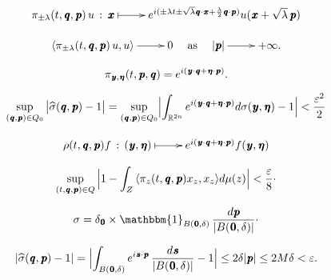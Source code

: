 \documentclass[11pt,english,a4paper]{article}
\begin{document}
\[
\xymatrix{
\pi _{\pm\lambda }(t,{\mkern 1.5 mu\pmb{q}},{\mkern 1.5 mu\pmb{p}})\,u\,:\,{\mkern 1.5 mu\pmb{x}}\ar@{|->}[r]&e^{i(\pm\lambda t\pm\sqrt{\lambda }{\mkern 1.5 mu\pmb{q}}\cdot {\mkern 1.5 mu\pmb{x}}+\frac{\lambda }{2}{\mkern 1.5 mu\pmb{q}}\cdot{\mkern 1.5 mu\pmb{p}})}u({\mkern 1.5 mu\pmb{x}}+\sqrt{\lambda }\,{\mkern 1.5 mu\pmb{p}})
}
\]

\[
\xymatrix{{\ensuremath{{\langle {\pi _{\pm\lambda }(t,{\mkern 1.5 mu\pmb{q}},{\mkern 1.5 mu\pmb{p}})\,u},{u}\rangle}}}\ar[r]&0}\quad\textrm{as}\quad
\xymatrix{|{\mkern 1.5 mu\pmb{p}}|\ar[r]&+\infty .}
\]

\[
\pi _{{\mkern 1.5 mu\pmb{y}},{\mkern 1.5 mu\pmb{\eta}} }(t,{\mkern 1.5 mu\pmb{p}},{\mkern 1.5 mu\pmb{q}})=e^{i({\mkern 1.5 mu\pmb{y}}\cdot{\mkern 1.5 mu\pmb{q}}+{\mkern 1.5 mu\pmb{\eta}}\cdot {\mkern 1.5 mu\pmb{p}})}.
\]

\begin{equation}\label{Equation 20}
 \sup_{({\mkern 1.5 mu\pmb{q}},{\mkern 1.5 mu\pmb{p}})\in{Q}_{0}}\,\bigl|\widehat{\sigma }({\mkern 1.5 mu\pmb{q}},{\mkern 1.5 mu\pmb{p}})-1\bigr|=\sup_{({\mkern 1.5 mu\pmb{q}},{\mkern 1.5 mu\pmb{p}})\in{Q}_{0}}
\Bigl|\int_{{\ensuremath{\mathbb R}}^{2n}}e^{i({\mkern 1.5 mu\pmb{y}}\cdot {\mkern 1.5 mu\pmb{q}}+{\mkern 1.5 mu\pmb{\eta}} \cdot{\mkern 1.5 mu\pmb{p}})}d\sigma ({\mkern 1.5 mu\pmb{y}},{\mkern 1.5 mu\pmb{\eta}} )-1\Bigr|<\dfrac{\varepsilon^{2}}{2} 
\end{equation}

\[
\xymatrix{
\rho (t,{\mkern 1.5 mu\pmb{q}},{\mkern 1.5 mu\pmb{p}})f\,:\,({\mkern 1.5 mu\pmb{y}},{\mkern 1.5 mu\pmb{\eta}} )\ar@{|->}[r]&e^{i({\mkern 1.5 mu\pmb{y}}\cdot{\mkern 1.5 mu\pmb{q}}+{\mkern 1.5 mu\pmb{\eta}} \cdot{\mkern 1.5 mu\pmb{p}})}f({\mkern 1.5 mu\pmb{y}},{\mkern 1.5 mu\pmb{\eta}} )
}
\]

\begin{equation}\label{Eq17}
\sup_{(t,{\mkern 1.5 mu\pmb{q}},{\mkern 1.5 mu\pmb{p}})\in{Q}}\,\Bigl|1-\int_{Z}{\ensuremath{{\langle {\pi _{z}(t,{\mkern 1.5 mu\pmb{q}},{\mkern 1.5 mu\pmb{p}})x_{z}},{x_{z}}\rangle}}}d\mu (z)\Bigr|<\dfrac{\varepsilon}{8}\cdot 
\end{equation}

\[
\sigma =\delta _{\mkern 1.5 mu\pmb{0}}\times\mathbbm{1}_{B({\mkern 1.5 mu\pmb{0}},\delta )}\,\dfrac{d{\mkern 1.5 mu\pmb{p}}}{|B({\mkern 1.5 mu\pmb{0}},\delta)| }\cdot 
\]

\[
|\widehat{\sigma }({\mkern 1.5 mu\pmb{q}},{\mkern 1.5 mu\pmb{p}})-1|=\Bigl|\int_{B({\mkern 1.5 mu\pmb{0}},\delta )}e^{i{\mkern 1.5 mu\pmb{s}}\cdot{\mkern 1.5 mu\pmb{p}}}\,\dfrac{d{\mkern 1.5 mu\pmb{s}}}{|B({\mkern 1.5 mu\pmb{0}},\delta )| }-1\Bigr|\le 2\delta |{\mkern 1.5 mu\pmb{p}}|\le 2M\delta <\varepsilon. 
\]
\end{document}
